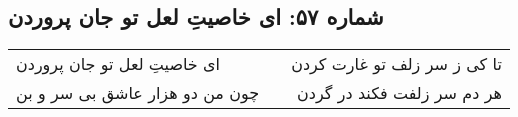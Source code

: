 \begin{center}
\section*{شماره ۵۷: ای خاصیتِ لعل تو جان پروردن}
\label{sec:057}
\begin{longtable}{l p{0.5cm} r}
ای خاصیتِ لعل تو جان پروردن
&&
تا کی ز سر زلف تو غارت کردن
\\
چون من دو هزار عاشق بی سر و بن
&&
هر دم سر زلفت فکند در گردن
\\
\end{longtable}
\end{center}
